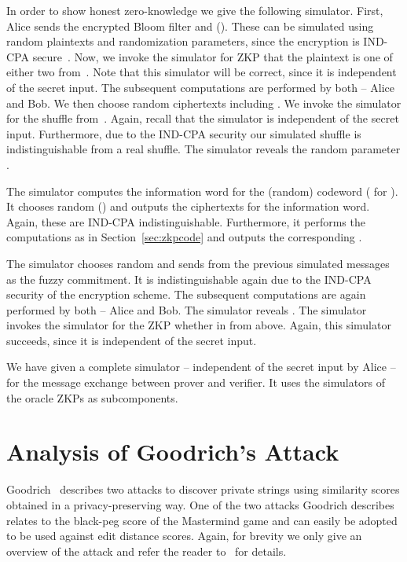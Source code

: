\documentclass{llncs}
\begin{document}
In order to show honest zero-knowledge we give the following simulator.
First, Alice sends the encrypted Bloom filter  and  ().
These can be simulated using random plaintexts and randomization parameters, since the encryption is IND-CPA secure~\cite{BonGoh05}.
Now, we invoke the simulator for ZKP that the plaintext is one of either two from~\cite{DamJur01}.
Note that this simulator will be correct, since it is independent of the secret input.
The subsequent computations are performed by both -- Alice and Bob.
We then choose  random ciphertexts including .
We invoke the simulator for the shuffle from~\cite{Gro10}.
Again, recall that the simulator is independent of the secret input.
Furthermore, due to the IND-CPA security our simulated shuffle is indistinguishable from a real shuffle.
The simulator reveals the random parameter .



The simulator computes the information word  for the (random) codeword  ( for ).
It chooses random  () and outputs the ciphertexts  for the information word.
Again, these are IND-CPA indistinguishable.
Furthermore, it performs the computations as in Section~\ref{sec:zkpcode} and outputs the corresponding .

The simulator chooses random  and sends from the previous simulated messages  as the fuzzy commitment.
It is indistinguishable again due to the IND-CPA security of the encryption scheme.
The subsequent computations are again performed by both -- Alice and Bob.
The simulator reveals .
The simulator invokes the simulator for the ZKP whether  in  from above.
Again, this simulator succeeds, since it is independent of the secret input.

We have given a complete simulator -- independent of the secret input by Alice -- for the message exchange between prover and verifier.
It uses the simulators of the oracle ZKPs as subcomponents.

\section{Analysis of Goodrich's Attack}
\label{sec:analysis}

Goodrich~\cite{Goo09} describes two attacks to discover private strings using similarity scores obtained in a privacy-preserving way.
One of the two attacks Goodrich describes relates to the black-peg score of the Mastermind game and can easily be adopted to be used against edit distance scores.
Again, for brevity we only give an overview of the attack and refer the reader to~\cite{Goo09} for details.
\end{document}
